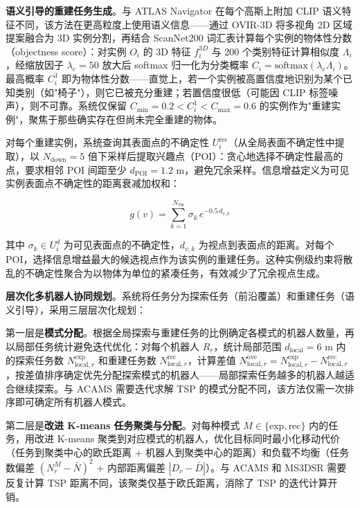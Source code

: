 \textbf{语义引导的重建任务生成}。与 ATLAS Navigator 在每个高斯上附加 CLIP 语义特征不同，该方法在更高粒度上使用语义信息——通过 OVIR-3D 将多视角 2D 区域提案融合为 3D 实例分割，再结合 ScanNet200 词汇表计算每个实例的物体性分数（objectness score）：对实例 $O_i$ 的 3D 特征 $f_i^{3D}$ 与 200 个类别特征计算相似度 $\Lambda_i$，经缩放因子 $\lambda_e=50$ 放大后 softmax 归一化为分类概率 $C_i = \text{softmax}(\lambda_e \Lambda_i)$。最高概率 $C_i^1$ 即为物体性分数——直觉上，若一个实例被高置信度地识别为某个已知类别（如"椅子"），则它已被充分重建；若置信度很低（可能因 CLIP 标签噪声），则不可靠。系统仅保留 $C_\text{min}=0.2 < C_i^1 < C_\text{max}=0.6$ 的实例作为"重建实例"，聚焦于那些确实存在但尚未完全重建的物体。

对每个重建实例，系统查询其表面点的不确定性 $U_i^\text{rec}$（从全局表面不确定性中提取），以 $N_\text{down}=5$ 倍下采样后提取兴趣点（POI）：贪心地选择不确定性最高的点，要求相邻 POI 间距至少 $d_\text{POI}=1.2$ m，避免冗余采样。信息增益定义为可见实例表面点不确定性的距离衰减加权和：

\begin{equation}
g(v) = \sum_{k=1}^{N_\text{vis}} \sigma_k \, e^{-0.5 \, d_{v,k}}
\end{equation}

其中 $\sigma_k \in U_i^d$ 为可见表面点的不确定性，$d_{v,k}$ 为视点到表面点的距离。对每个 POI，选择信息增益最大的候选视点作为该实例的重建任务。这种实例级约束将散乱的不确定性聚合为以物体为单位的紧凑任务，有效减少了冗余视点生成。

\textbf{层次化多机器人协同规划}。系统将任务分为探索任务（前沿覆盖）和重建任务（语义引导），采用三层层次化规划：

第一层是\textbf{模式分配}。根据全局探索与重建任务的比例确定各模式的机器人数量，再以局部任务统计避免迭代优化：对每个机器人 $R_r$，统计局部范围 $d_\text{local}=6$ m 内的探索任务数 $N_{\text{local},r}^\text{exp}$ 和重建任务数 $N_{\text{local},r}^\text{rec}$，计算差值 $N_{\text{local},r}^\text{ove} = N_{\text{local},r}^\text{exp} - N_{\text{local},r}^\text{rec}$，按差值排序确定优先分配探索模式的机器人——局部探索任务越多的机器人越适合继续探索。与 ACAMS 需要迭代求解 TSP 的模式分配不同，该方法仅需一次排序即可确定所有机器人模式。

第二层是\textbf{改进 K-means 任务聚类与分配}。对每种模式 $M \in \{\text{exp}, \text{rec}\}$ 内的任务，用改进 K-means 聚类到对应模式的机器人，优化目标同时最小化移动代价（任务到聚类中心的欧氏距离 + 机器人到聚类中心的距离）和负载不均衡（任务数偏差 $(N_r^M - \bar{N})^2$ + 内部距离偏差 $|D_r - \bar{D}|$）。与 ACAMS 和 MS3DSR 需要反复计算 TSP 距离不同，该聚类仅基于欧氏距离，消除了 TSP 的迭代计算开销。


